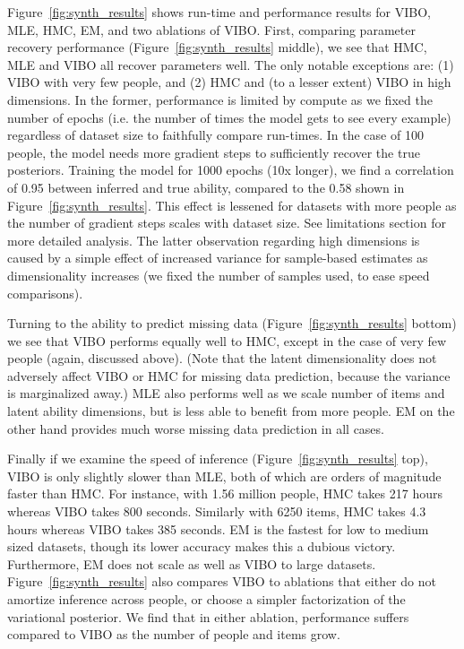 Figure~\ref{fig:synth_results} shows run-time and performance results for VIBO, MLE, HMC, EM, and two ablations of VIBO.
First, comparing parameter recovery performance (Figure~\ref{fig:synth_results} middle), we see that HMC, MLE and VIBO all recover parameters well.
The only notable exceptions are: (1) VIBO with very few people, and (2) HMC and (to a lesser extent) VIBO in high dimensions.
In the former, performance is limited by compute as we fixed the number of epochs (i.e. the number of times the model gets to see every example) regardless of dataset size to faithfully compare run-times. In the case of 100 people, the model needs more gradient steps to sufficiently recover the true posteriors. Training the model for 1000 epochs (10x longer), we find a correlation of 0.95 between inferred and true ability, compared to the 0.58 shown in Figure~\ref{fig:synth_results}. This effect is lessened for datasets with more people as the number of gradient steps scales with dataset size. See limitations section for more detailed analysis.
The latter observation regarding high dimensions is caused by a simple effect of increased variance for sample-based estimates as dimensionality increases (we fixed the number of samples used, to ease speed comparisons).

Turning to the ability to predict missing data (Figure~\ref{fig:synth_results} bottom) we see that VIBO performs equally well to HMC, except in the case of very few people (again, discussed above).
(Note that the latent dimensionality does not adversely affect VIBO or HMC for missing data prediction, because the variance is marginalized away.)
MLE also performs well as we scale number of items and latent ability dimensions, but is less able to benefit from more people.
EM on the other hand provides much worse missing data prediction in all cases.

Finally if we examine the speed of inference (Figure~\ref{fig:synth_results} top), VIBO is only slightly slower than MLE, both of which are orders of magnitude faster than HMC.
For instance, with 1.56 million people, HMC takes 217 hours whereas VIBO takes 800 seconds.
Similarly with 6250 items, HMC takes 4.3 hours whereas VIBO takes 385 seconds.
EM is the fastest for low to medium sized datasets, though its lower accuracy makes this a dubious victory.
Furthermore, EM does not scale as well as VIBO to large datasets.
Figure~\ref{fig:synth_results} also compares VIBO to ablations that either do not amortize inference across people, or choose a simpler factorization of the variational posterior. We find that in either ablation, performance suffers compared to VIBO as the number of people and items grow. 


